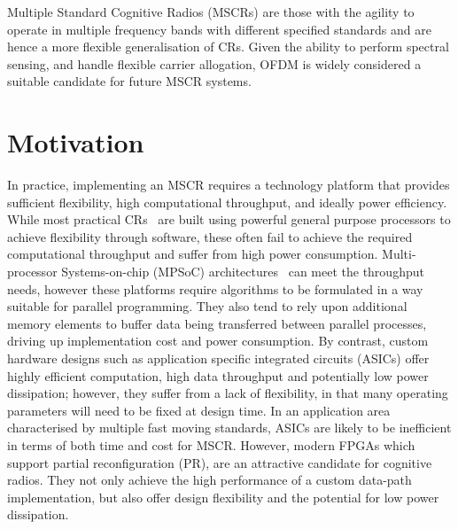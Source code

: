 Multiple Standard Cognitive Radios (MSCRs) are those with the agility to operate in multiple frequency bands with different specified standards and are hence a more flexible generalisation of CRs. %
Given the ability to perform spectral sensing, and handle flexible carrier allogation, OFDM is widely considered a suitable candidate for future MSCR systems.

\section{Motivation}

In practice, implementing an MSCR requires a technology platform that provides sufficient flexibility, high computational throughput, and ideally power efficiency.
While most practical CRs~\cite{gnuradio,Sutton2010} are built using powerful general purpose processors to achieve flexibility through software, these often fail to achieve the required computational throughput and suffer from high power consumption.
Multi-processor Systems-on-chip (MPSoC) architectures~\cite{tan2011sora} can meet the throughput needs, however these platforms require algorithms to be formulated in a way suitable for parallel programming.
They also tend to rely upon additional memory elements to buffer data being transferred between parallel processes, driving up implementation cost and power consumption.
By contrast, custom hardware designs such as application specific integrated circuits (ASICs) offer highly efficient computation, high data throughput and potentially low power dissipation; however, they suffer from a lack of flexibility, in that many operating parameters will need to be fixed at design time.
In an application area characterised by multiple fast moving standards, ASICs are likely to be inefficient in terms of both time and cost for MSCR.
However, modern FPGAs which support partial reconfiguration (PR), are an attractive candidate for cognitive radios.
They not only achieve the high performance of a custom data-path implementation, but also offer design flexibility and the potential for low power dissipation.

